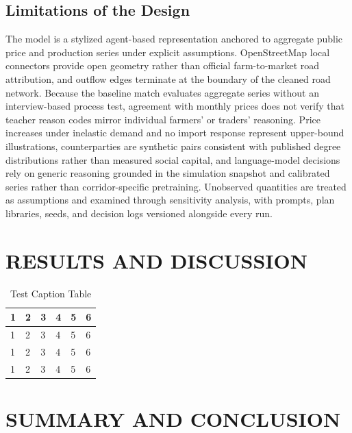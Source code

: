 \documentclass{icsthesis}
\begin{document}
\begin{mainmatter}
		\subsection{Limitations of the Design}

			The model is a stylized agent-based representation anchored to aggregate public price and production series under explicit assumptions. OpenStreetMap local connectors provide open geometry rather than official farm-to-market road attribution, and outflow edges terminate at the boundary of the cleaned road network. Because the baseline match evaluates aggregate series without an interview-based process test, agreement with monthly prices does not verify that teacher reason codes mirror individual farmers' or traders' reasoning. Price increases under inelastic demand and no import response represent upper-bound illustrations, counterparties are synthetic pairs consistent with published degree distributions rather than measured social capital, and language-model decisions rely on generic reasoning grounded in the simulation snapshot and calibrated series rather than corridor-specific pretraining. Unobserved quantities are treated as assumptions and examined through sensitivity analysis, with prompts, plan libraries, seeds, and decision logs versioned alongside every run.
		
		
		\section{RESULTS AND DISCUSSION}
			\lipsum[4]
			
			\begin{table}[ht]
			\vspace{4ex}
			\centering
				\caption{Test Caption Table}
				
				\label{table:Test Caption Table}
				\begin{tabular*}{\textwidth}{@{\extracolsep{\fill}}llllll}
				\hline
				\hline
				1 & 2 & 3 & 4 & 5 & 6 \\ \hline
				1 & 2 & 3 & 4 & 5 & 6 \\
				1 & 2 & 3 & 4 & 5 & 6 \\
				1 & 2 & 3 & 4 & 5 & 6 \\ \hline\hline
				\end{tabular*} 
			\vspace{4ex}
			\end{table}
			
			\lipsum[4-10]
			\lipsum[5]
		
		\section{SUMMARY AND CONCLUSION}
			\lipsum[4]
		
			
	\end{mainmatter}
\end{document}
